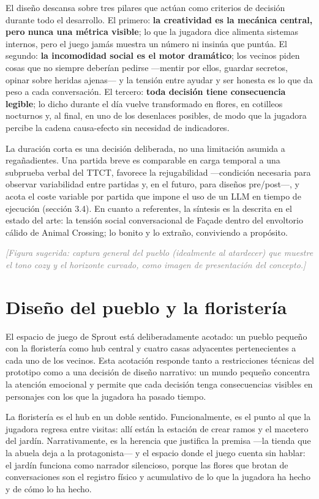 \documentclass[12pt,twoside,titlepage]{report}
\begin{document}
El diseño descansa sobre tres pilares que actúan como criterios de decisión durante todo el desarrollo. El primero: \textbf{la creatividad es la mecánica central, pero nunca una métrica visible}; lo que la jugadora dice alimenta sistemas internos, pero el juego jamás muestra un número ni insinúa que puntúa. El segundo: \textbf{la incomodidad social es el motor dramático}; los vecinos piden cosas que no siempre deberían pedirse ---mentir por ellos, guardar secretos, opinar sobre heridas ajenas--- y la tensión entre ayudar y ser honesta es lo que da peso a cada conversación. El tercero: \textbf{toda decisión tiene consecuencia legible}; lo dicho durante el día vuelve transformado en flores, en cotilleos nocturnos y, al final, en uno de los desenlaces posibles, de modo que la jugadora percibe la cadena causa-efecto sin necesidad de indicadores.

La duración corta es una decisión deliberada, no una limitación asumida a regañadientes. Una partida breve es comparable en carga temporal a una subprueba verbal del TTCT, favorece la rejugabilidad ---condición necesaria para observar variabilidad entre partidas y, en el futuro, para diseños pre/post---, y acota el coste variable por partida que impone el uso de un LLM en tiempo de ejecución (sección 3.4). En cuanto a referentes, la síntesis es la descrita en el estado del arte: la tensión social conversacional de Façade dentro del envoltorio cálido de Animal Crossing; lo bonito y lo extraño, conviviendo a propósito.

\textcolor{gray}{\textit{[Figura sugerida: captura general del pueblo (idealmente al atardecer) que muestre el tono cozy y el horizonte curvado, como imagen de presentación del concepto.]}}

\section{Diseño del pueblo y la floristería}

El espacio de juego de Sprout está deliberadamente acotado: un pueblo pequeño con la floristería como hub central y cuatro casas adyacentes pertenecientes a cada uno de los vecinos. Esta acotación responde tanto a restricciones técnicas del prototipo como a una decisión de diseño narrativo: un mundo pequeño concentra la atención emocional y permite que cada decisión tenga consecuencias visibles en personajes con los que la jugadora ha pasado tiempo.

La floristería es el hub en un doble sentido. Funcionalmente, es el punto al que la jugadora regresa entre visitas: allí están la estación de crear ramos y el macetero del jardín. Narrativamente, es la herencia que justifica la premisa ---la tienda que la abuela deja a la protagonista--- y el espacio donde el juego cuenta sin hablar: el jardín funciona como narrador silencioso, porque las flores que brotan de conversaciones son  el registro físico y acumulativo de lo que la jugadora ha hecho y de cómo lo ha hecho. 
\end{document}
